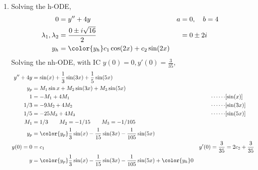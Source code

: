 \begin{enumerate}
    \item Solving the h-ODE,
          \begin{align}
              0                        & = y'' + 4y                                  & a & = 0, \quad b = 4 \\
              \lambda_{1}, \lambda_{2} & = \frac{0 \pm i\sqrt{16}}{2}                &   & = 0 \pm 2i       \\
              y_{h}                    & = \color{y_h} c_{1}\cos(2x) + c_{2}\sin(2x)
          \end{align}
          Solving the nh-ODE, with IC $ y(0) = 0, y'(0) = \frac{3}{35} $,
          \begin{align}
              y'' + 4y & = \sin(x) + \frac{1}{3}\sin(3x) + \frac{1}{5}\sin(5x)                                                                                               \\
              y_{p}    & = M_{1} \sin x + M_{2}\sin(3x) + M_{3}\sin(5x)                                                                                                      \\
              1        & = -M_{1} + 4M_{1}                                                                                  & \cdots\cdots         & [\sin(x)]               \\
              1/3      & = -9M_{2} + 4M_{2}                                                                                 & \cdots\cdots         & [\sin(3x)]              \\
              1/5      & = -25M_{3}  + 4M_{3}                                                                               & \cdots\cdots         & [\sin(5x)]              \\
              M_{1}    & = 1/3 \qquad M_{2} = -1/15 \qquad M_{3} = -1/105                                                                                                    \\
              y_{p}    & = \color{y_p} \frac{1}{3}\sin(x) - \frac{1}{15}\sin(3x) - \frac{1}{105}\sin(5x)                                                                     \\
              y(0) = 0 & = c_{1}                                                                                            & y'(0) = \frac{3}{35} & = 2c_{2} + \frac{3}{35} \\
              y        & = {\color{y_p} \frac{1}{3}\sin(x) - \frac{1}{15}\sin(3x) - \frac{1}{105}\sin(5x)} + {\color{y_h}0}
          \end{align}


\end{enumerate}

